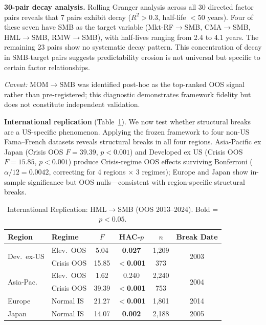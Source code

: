 \documentclass[sigconf,anonymous]{acmart}
\begin{document}
\textbf{30-pair decay analysis.}
Rolling Granger analysis across all 30 directed factor pairs reveals that 7 pairs
exhibit decay ($R^2 > 0.3$, half-life $< 50$ years). Four of these seven have SMB
as the target variable (Mkt-RF$\to$SMB, CMA$\to$SMB, HML$\to$SMB, RMW$\to$SMB),
with half-lives ranging from 2.4 to 4.1 years. The remaining 23 pairs show no
systematic decay pattern. This concentration of decay in SMB-target pairs suggests
predictability erosion is not universal but specific to certain factor relationships.

\emph{Caveat:} MOM$\to$SMB was identified post-hoc as the
top-ranked OOS signal rather than pre-registered; this diagnostic
demonstrates framework fidelity but does not constitute independent
validation.

\textbf{International replication} (Table~\ref{tab:international}).
We now test whether structural breaks are a US-specific phenomenon.
Applying the frozen framework to four non-US Fama--French datasets
reveals structural breaks in all four regions. Asia-Pacific ex Japan
(Crisis OOS $F = 39.39$, $p < 0.001$) and Developed ex US
(Crisis OOS $F = 15.85$, $p < 0.001$) produce Crisis-regime
OOS effects surviving Bonferroni ($\alpha/12 = 0.0042$, correcting
for 4 regions $\times$ 3 regimes);
Europe and Japan show in-sample significance but OOS nulls---consistent
with region-specific structural breaks.

\begin{table}[t]
\centering
\caption{International Replication: HML$\to$SMB (OOS 2013--2024).
Bold = $p < 0.05$.}
\label{tab:international}
\scriptsize
\begin{tabular}{@{}llcccc@{}}
\toprule
Region & Regime & $F$ & HAC-$p$ & $n$ & Break Date \\
\midrule
\multirow{2}{*}{Dev.\ ex-US} & Elev.\ OOS & 5.04 & \textbf{0.027} & 1{,}209 & \multirow{2}{*}{2003} \\
& Crisis OOS & 15.85 & \textbf{$<$0.001} & 373 & \\
\midrule
\multirow{2}{*}{Asia-Pac.} & Elev.\ OOS & 1.62 & 0.240 & 2{,}240 & \multirow{2}{*}{2004} \\
& Crisis OOS & 39.39 & \textbf{$<$0.001} & 753 & \\
\midrule
Europe & Normal IS & 21.27 & \textbf{$<$0.001} & 1{,}801 & 2014 \\
Japan & Normal IS & 14.07 & \textbf{0.002} & 2{,}188 & 2005 \\
\bottomrule
\end{tabular}
\end{table}
\end{document}
